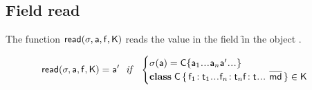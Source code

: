 \documentclass[acmlarge, anonymous, authordraft]{acmart}
\begin{document}
\begin{mathpar}










\end{mathpar}


\subsection{Field read}

The function $\readf\s\a\f\K$ reads the value in the field \f in the object \a.

\begin{equation*}
\readf \s\a\f\K = \ap 
  ~~\mathit{if}~~ \begin{cases}  \s(\a) = \obj\C{\a_1\dots\a_n \ap \dots}\\
 \Class\C {\Fdef{\f_1}{\t_1}\dots\Fdef{\f_n}{\t_n}\Ftype\f\t\dots}{\b\md}\in\K
 \end{cases}
\end{equation*}
\end{document}
